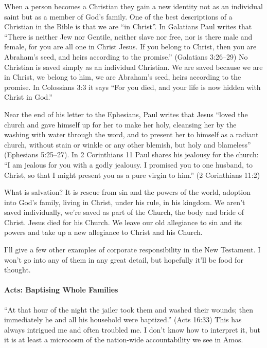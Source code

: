 When a person becomes a Christian they gain a new identity not as an individual
saint but as a member of God's family. One of the best descriptions of a
Christian in the Bible is that we are \enquote{in Christ}. In Galatians Paul
writes that \enquote{There is neither Jew nor Gentile, neither slave nor free,
nor is there male and female, for you are all one in Christ Jesus. If you belong
to Christ, then you are Abraham's seed, and heirs according to the promise.}
(Galatians 3:26--29) No Christian is saved simply as an individual Christian.
We are saved because we are in Christ, we belong to him, we are Abraham's seed,
heirs according to the promise. In Colossians 3:3 it says \enquote{For you died,
and your life is now hidden with Christ in God.}

Near the end of his letter to the Ephesians, Paul writes that Jesus
\enquote{loved the church and gave himself up for her to make her holy,
cleansing her by the washing with water through the word, and to present her to
himself as a radiant church, without stain or winkle or any other blemish, but
holy and blameless} (Ephesians 5:25--27). In 2 Corinthians 11 Paul shares his
jealousy for the church: \enquote{I am jealous for you with a godly jealousy. I
promised you to one husband, to Christ, so that I might present you as a pure
virgin to him.} (2 Corinthians 11:2)

What is salvation? It is rescue from sin and the powers of the world, adoption
into God's family, living in Christ, under his rule, in his kingdom. We aren't
saved individually, we're saved as part of the Church, the body and bride of
Christ. Jesus died for his Church. We leave our old allegiance to sin and its
powers and take up a new allegiance to Christ and his Church.

I'll give a few other examples of corporate responsibility in the New Testament.
I won't go into any of them in any great detail, but hopefully it'll be food for
thought.

\paragraph{Acts: Baptising Whole Families} \enquote{At that hour of the night
the jailer took them and washed their wounds; then immediately he and all his
household were baptized.} (Acts 16:33) This has always intrigued me and often
troubled me. I don't know how to interpret it, but it is at least a microcosm of
the nation-wide accountability we see in Amos.

